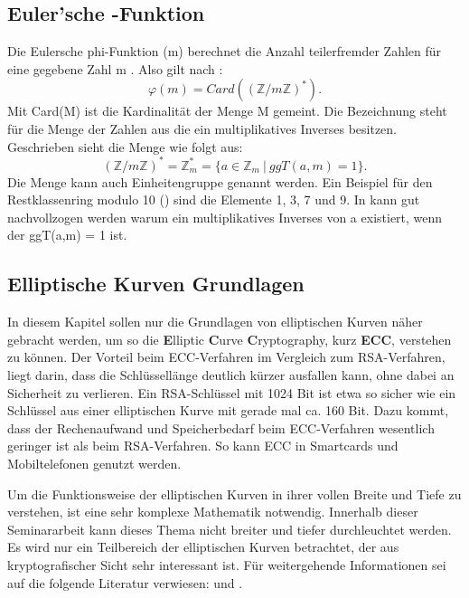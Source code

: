 		\subsection{Euler’sche \myPhi -Funktion}
			Die Eulersche phi-Funktion \myPhi(m) berechnet die Anzahl teilerfremder Zahlen für eine gegebene Zahl m . Also gilt nach \cite{Algorithmische:Zahlentheorie}: 
			\begin{displaymath}
				\varphi(m) = Card((\mathbb{Z}/m\mathbb{Z})^*).
			\end{displaymath}			
			Mit Card(M) ist die Kardinalität der Menge M gemeint. Die Bezeichnung  steht für die Menge der Zahlen aus  die ein multiplikatives Inverses besitzen. Geschrieben sieht die Menge wie folgt aus:
			\begin{displaymath}
				(\mathbb{Z}/m\mathbb{Z})^* = \mathbb{Z}_m^* = \{a \in \mathbb{Z}_m ~|~ggT(a,m) = 1\}.
			\end{displaymath}
			Die Menge  kann auch Einheitengruppe genannt werden. Ein Beispiel für den Restklassenring modulo 10 () sind die Elemente 1, 3, 7 und 9. In \cite{Mathematik:fuer:Informatiker} kann gut nachvollzogen werden warum ein multiplikatives Inverses von a existiert, wenn der ggT(a,m) = 1 ist.
		
	\subsection{Elliptische Kurven Grundlagen}\label{Elliptischen Kurven Grundlagen}
		In diesem Kapitel sollen nur die Grundlagen von elliptischen Kurven näher gebracht werden, um so die \textbf{E}lliptic \textbf{C}urve \textbf{C}ryptography, kurz \textbf{ECC}, verstehen zu können. Der Vorteil beim ECC-Verfahren im Vergleich zum RSA-Verfahren, liegt darin, dass die Schlüssellänge deutlich kürzer ausfallen kann, ohne dabei an Sicherheit zu verlieren. Ein RSA-Schlüssel mit 1024 Bit ist etwa so sicher wie ein Schlüssel aus einer elliptischen Kurve mit gerade mal ca. 160 Bit. Dazu kommt, dass der Rechenaufwand und Speicherbedarf beim ECC-Verfahren wesentlich geringer ist als beim RSA-Verfahren. So kann ECC in Smartcards und Mobiltelefonen genutzt werden.\cite{Information:und:Kommunikation}
		
		Um die Funktionsweise der elliptischen Kurven in ihrer vollen Breite und Tiefe zu verstehen, ist eine sehr komplexe Mathematik notwendig. Innerhalb dieser Seminararbeit kann dieses Thema nicht breiter und tiefer durchleuchtet werden. Es wird nur ein Teilbereich der elliptischen Kurven betrachtet, der aus kryptografischer Sicht sehr interessant ist. Für weitergehende Informationen sei auf die folgende Literatur verwiesen: \cite{Information:und:Kommunikation} und \cite{Kryptographie:und:IT-Sicherheit}.
		
